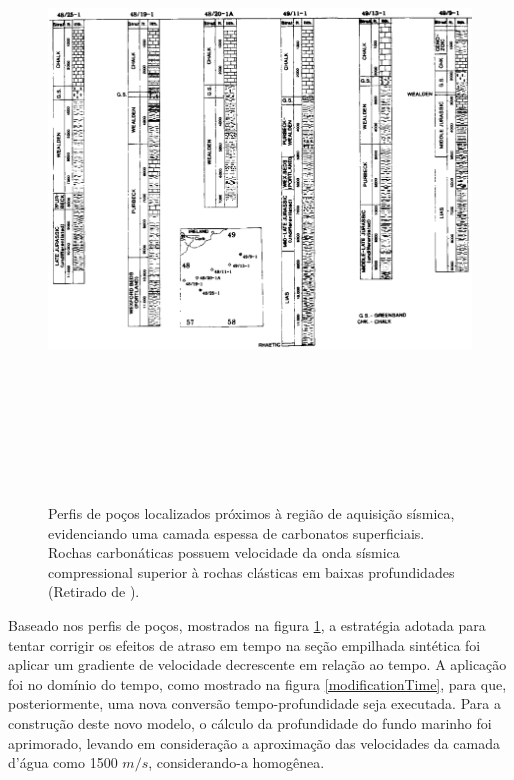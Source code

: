 \documentclass[
	12pt,				%
	openright,			%
	oneside,			%
	a4paper,			%
	english,			%
	brazil				%
	]{abntex2}
\begin{document}
	\newpage
	\begin{figure}[htp!]
		\centering
		\includegraphics[width=16cm,height=17cm]{../imagens/pocos.png}
		\caption{Perfis de poços localizados próximos à região de aquisição sísmica, evidenciando uma camada espessa de carbonatos superficiais. Rochas carbonáticas possuem velocidade da onda sísmica compressional superior à rochas clásticas em baixas profundidades (Retirado de ).}
		\label{stratigraphy}
	\end{figure}
%
	Baseado nos perfis de poços, mostrados na figura \ref{stratigraphy}, a estratégia adotada para tentar corrigir os efeitos de atraso em tempo na seção empilhada sintética foi aplicar um gradiente de velocidade decrescente em relação ao tempo. A aplicação foi no domínio do tempo, como mostrado na figura \ref{modificationTime}, para que, posteriormente, uma nova conversão tempo-profundidade seja executada. Para a construção deste novo modelo, o cálculo da profundidade do fundo marinho foi aprimorado, levando em consideração a aproximação das velocidades da camada d'água como 1500 $m/s$, considerando-a homogênea. 
	
\end{document}
